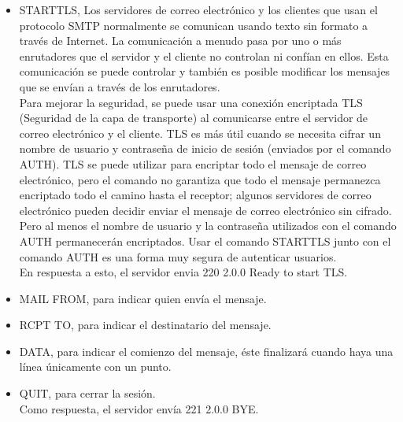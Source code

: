 \documentclass[osajnl,twocolumn,showpacs,superscriptaddress,10pt]{revtex4-1} %
\begin{document}
\begin{enumerate}[a)]
\begin{itemize}
    \item STARTTLS, Los servidores de correo electrónico y los clientes que usan el protocolo SMTP normalmente se comunican usando texto sin formato a través de Internet. La comunicación a menudo pasa por uno o más enrutadores que el servidor y el cliente no controlan ni confían en ellos. Esta comunicación se puede controlar y también es posible modificar los mensajes que se envían a través de los enrutadores. \\
    
    Para mejorar la seguridad, se puede usar una conexión encriptada TLS (Seguridad de la capa de transporte) al comunicarse entre el servidor de correo electrónico y el cliente. TLS es más útil cuando se necesita cifrar un nombre de usuario y contraseña de inicio de sesión (enviados por el comando AUTH). TLS se puede utilizar para encriptar todo el mensaje de correo electrónico, pero el comando no garantiza que todo el mensaje permanezca encriptado todo el camino hasta el receptor; algunos servidores de correo electrónico pueden decidir enviar el mensaje de correo electrónico sin cifrado. Pero al menos el nombre de usuario y la contraseña utilizados con el comando AUTH permanecerán encriptados. Usar el comando STARTTLS junto con el comando AUTH es una forma muy segura de autenticar usuarios. \\
    
    En respuesta a esto, el servidor envia 220 2.0.0 Ready to start TLS. \\
    
    \item MAIL FROM, para indicar quien envía el mensaje. \\
    
    \item RCPT TO, para indicar el destinatario del mensaje. \\
    
    \item DATA, para indicar el comienzo del mensaje, éste finalizará cuando haya una línea únicamente con un punto. \\
    
    \item QUIT, para cerrar la sesión. \\
    
    Como respuesta, el servidor envía 221 2.0.0 BYE. \\

  \end{itemize}
  

\end{enumerate}
\end{document}
